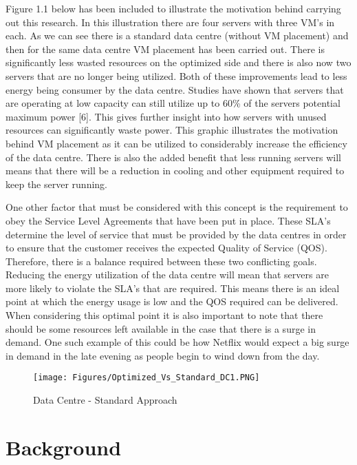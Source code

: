 \documentclass[oneside,12pt]{Classes/RoboticsLaTeX}
\begin{document}
Figure 1.1 below has been included to illustrate the motivation behind carrying out this research. In this illustration there are four servers with three VM's in each. As we can see there is a standard data centre (without VM placement) and then for the same data centre VM placement has been carried out. There is significantly less wasted resources on the optimized side and there is also now two servers that are no longer being utilized. Both of these improvements lead to less energy being consumer by the data centre. Studies have shown that servers that are operating at low capacity can still utilize up to 60\% of the servers potential maximum power [6]. This gives further insight into how servers with unused resources can significantly waste power. This graphic illustrates the motivation behind VM placement as it can be utilized to considerably increase the efficiency of the data centre. There is also the added benefit that less running servers will means that there will be a reduction in cooling and other equipment required to keep the server running.  

One other factor that must be considered with this concept is the requirement to obey the Service Level Agreements that have been put in place. These SLA's determine the level of service that must be provided by the data centres in order to ensure that the customer receives the expected Quality of Service (QOS). Therefore, there is a balance required between these two conflicting goals. Reducing the energy utilization of the data centre will mean that servers are more likely to violate the SLA's that are required. This means there is an ideal point at which the energy usage is low and the QOS required can be delivered. When considering this optimal point it is also important to note that there should be some resources left available in the case that there is a surge in demand. One such example of this could be how Netflix would expect a big surge in demand in the late evening as people begin to wind down from the day.

\begin{figure}[h]
\centering
\texttt{[image: Figures/Optimized\_Vs\_Standard\_DC1.PNG]}
\caption{Data Centre - Standard Approach}
\end{figure}

\chapter{Background}
\label{chap:backg}
\end{document}
